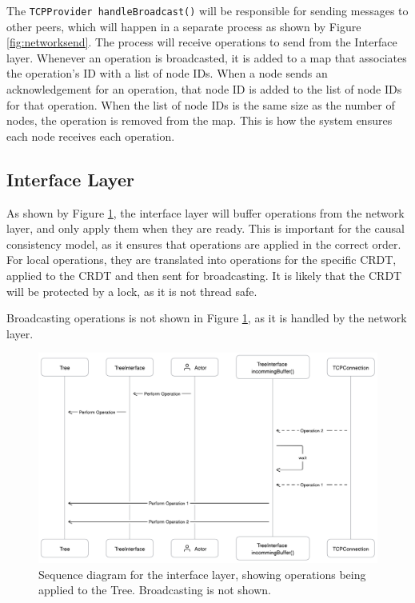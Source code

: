 \documentclass[12pt]{report}
\begin{document}
The \texttt{TCPProvider handleBroadcast()} will be responsible for sending messages to other peers, which will happen in a separate process as shown by Figure \ref{fig:networksend}. The process will receive operations to send from the Interface layer. Whenever an operation is broadcasted, it is added to a map that associates the operation's ID with a list of node IDs. When a node sends an acknowledgement for an operation, that node ID is added to the list of node IDs for that operation. When the list of node IDs is the same size as the number of nodes, the operation is removed from the map. This is how the system ensures each node receives each operation. \par


\subsection{Interface Layer}

As shown by Figure \ref{fig:interfaceseq}, the interface layer will buffer operations from the network layer, and only apply them when they are ready. This is important for the causal consistency model, as it ensures that operations are applied in the correct order. For local operations, they are translated into operations for the specific CRDT, applied to the CRDT and then sent for broadcasting. It is likely that the CRDT will be protected by a lock, as it is not thread safe. \par

Broadcasting operations is not shown in Figure \ref{fig:interfaceseq}, as it is handled by the network layer. \par

\begin{figure}[h]
    \centering
    \includegraphics[width=1\textwidth]{images/treeinterface.png}
    \caption{Sequence diagram for the interface layer, showing operations being applied to the Tree. Broadcasting is not shown.}
    \label{fig:interfaceseq}
\end{figure}
\end{document}
